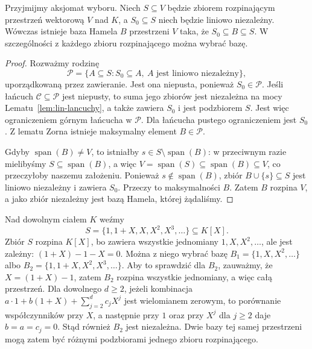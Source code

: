 \begin{twierdzenie}
\label{thm:lin-baza-z-generatorow-zorn}
Przyjmijmy aksjomat wyboru. Niech \(S\subseteq V\)
będzie zbiorem rozpinającym przestrzeń wektorową \(V\)
nad \(K\), a \(S_0\subseteq S\) niech będzie
liniowo niezależny.
Wówczas istnieje baza Hamela \(B\) przestrzeni \(V\)
taka, że \(S_0\subseteq B\subseteq S\).
W szczególności z każdego zbioru rozpinającego
można wybrać bazę.
\end{twierdzenie}
\begin{proof}
Rozważmy rodzinę
\[
 \mathcal P=\{A\subseteq S:
       S_0\subseteq A,\ A\text{ jest liniowo niezależny}\},
\]
uporządkowaną przez zawieranie.
Jest ona niepusta, ponieważ \(S_0\in\mathcal P\).
Jeśli łańcuch \(\mathcal C\subseteq\mathcal P\)
jest niepusty, to suma jego zbiorów jest niezależna
na mocy Lematu~\ref{lem:lin-lancuchy},
a także zawiera \(S_0\) i jest podzbiorem \(S\).
Jest więc ograniczeniem górnym łańcucha w \(\mathcal P\).
Dla łańcucha pustego ograniczeniem jest \(S_0\).
Z lematu Zorna istnieje maksymalny element
\(B\in\mathcal P\).

Gdyby \(\operatorname{span}(B)\neq V\),
to istniałby \(s\in S\setminus\operatorname{span}(B)\):
w przeciwnym razie mielibyśmy
\(S\subseteq\operatorname{span}(B)\),
a więc
\(V=\operatorname{span}(S)
\subseteq\operatorname{span}(B)\subseteq V\),
co przeczyłoby naszemu założeniu.
Ponieważ \(s\notin\operatorname{span}(B)\),
zbiór \(B\cup\{s\}\subseteq S\)
jest liniowo niezależny i zawiera \(S_0\).
Przeczy to maksymalności \(B\).
Zatem \(B\) rozpina \(V\), a jako zbiór
niezależny jest bazą Hamela, której żądaliśmy.
\end{proof}

\begin{przyklad}
\label{prz:lin-dwie-bazy-z-generatorow}
Nad dowolnym ciałem \(K\) weźmy
\[
 S=\{1,1+X,X,X^2,X^3,\ldots\}\subseteq K[X].
\]
Zbiór \(S\) rozpina \(K[X]\), bo zawiera wszystkie
jednomiany \(1,X,X^2,\ldots\), ale jest zależny:
\((1+X)-1-X=0\).
Można z niego wybrać bazę
\(B_1=\{1,X,X^2,\ldots\}\)
albo \(B_2=\{1,1+X,X^2,X^3,\ldots\}\).
Aby to sprawdzić dla \(B_2\), zauważmy, że
\(X=(1+X)-1\), zatem \(B_2\) rozpina
wszystkie jednomiany, a więc całą przestrzeń.
Dla dowolnego \(d\geq2\), jeżeli kombinacja
\(a\cdot1+b(1+X)+\sum_{j=2}^d c_jX^j\)
jest wielomianem zerowym, to porównanie
współczynników przy \(X\), a następnie
przy \(1\) oraz przy \(X^j\) dla \(j\geq2\)
daje \(b=a=c_j=0\).
Stąd również \(B_2\) jest niezależna.
Dwie bazy tej samej przestrzeni mogą
zatem być różnymi podzbiorami jednego
zbioru rozpinającego.
\end{przyklad}

